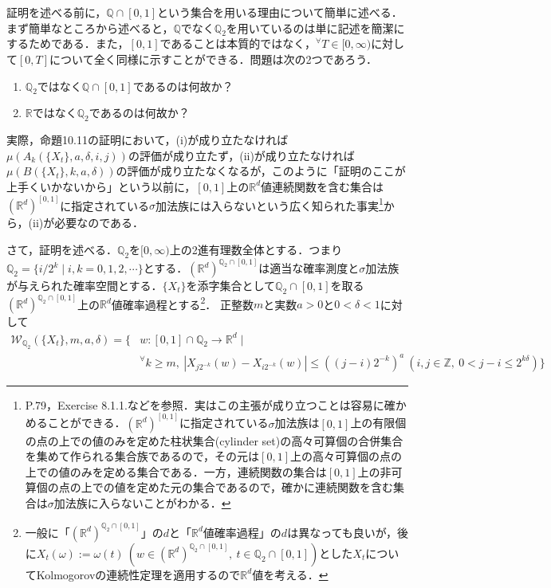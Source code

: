 \documentclass[dvipdfmx]{jsarticle}
\begin{document}
証明を述べる前に，$\mathbb{Q}\cap [0,1]$という集合を用いる理由について簡単に述べる．まず簡単なところから述べると，$\mathbb{Q}$でなく$\mathbb{Q}_2$を用いているのは単に記述を簡潔にするためである．また，$[0,1]$であることは本質的ではなく，$^\forall T\in [0,\infty)$に対して$[0,T]$について全く同様に示すことができる．問題は次の2つであろう．
\begin{enumerate}
\renewcommand{\labelenumi}{(\roman{enumi})}
\item $\mathbb{Q}_2$ではなく$\mathbb{Q}\cap [0,1]$であるのは何故か？
\item $\mathbb{R}$ではなく$\mathbb{Q}_2$であるのは何故か？
\end{enumerate}
実際，\cite{kotani}命題10.11の証明において，(i)が成り立たなければ$\mu(A_k(\{X_t\},a,\delta,i,j))$の評価が成り立たず，(ii)が成り立たなければ$\mu(B(\{X_t\},k,a,\delta))$の評価が成り立たなくなるが，このように「証明のここが上手くいかないから」という以前に，$[0,1]$上の$\mathbb{R}^d$値連続関数を含む集合は$(\mathbb{R}^d)^{[0,1]}$に指定されている$\sigma$加法族には入らないという広く知られた事実\footnote{\cite{kumagai}P.79，\cite{durrett}Exercise 8.1.1.などを参照．実はこの主張が成り立つことは容易に確かめることができる．$(\mathbb{R}^d)^{[0,1]}$に指定されている$\sigma$加法族は$[0,1]$上の有限個の点の上での値のみを定めた柱状集合(cylinder set)の高々可算個の合併集合を集めて作られる集合族であるので，その元は$[0,1]$上の高々可算個の点の上での値のみを定める集合である．一方，連続関数の集合は$[0,1]$上の非可算個の点の上での値を定めた元の集合であるので，確かに連続関数を含む集合は$\sigma$加法族に入らないことがわかる．}から，(ii)が必要なのである．
\par
%
さて，証明を述べる．$\mathbb{Q}_2$を$[0,\infty)$上の2進有理数全体とする．つまり$\mathbb{Q}_2=\{i/2^k\mid i,k=0,1,2,\cdots\}$とする．$(\mathbb{R}^d)^{\mathbb{Q}_2\cap [0,1]}$は適当な確率測度と$\sigma$加法族が与えられた確率空間とする．$\{X_t\}$を添字集合として$\mathbb{Q}_2\cap [0,1]$を取る$(\mathbb{R}^d)^{\mathbb{Q}_2\cap [0,1]}$上の$\mathbb{R}^d$値確率過程とする\footnote{一般に「$(\mathbb{R}^d)^{\mathbb{Q}_2\cap [0,1]}$」の$d$と「$\mathbb{R}^d$値確率過程」の$d$は異なっても良いが，後に$X_t(\omega):=\omega(t){\ }(w\in(\mathbb{R}^d)^{\mathbb{Q}_2\cap [0,1]},{\ }t\in\mathbb{Q}_2\cap [0,1])$とした$X_t$についてKolmogorovの連続性定理を適用するので$\mathbb{R}^d$値を考える．}．
正整数$m$と実数$a>0$と$0<\delta<1$に対して
\begin{align*}
\mathcal{W}_{\mathbb{Q}_2}(\{X_t\},m,a,\delta)=\{&w:[0,1]\cap\mathbb{Q}_2\to\mathbb{R}^d \mid \\
&^\forall k\geq m,{\ }|X_{j2^{-k}}(w)-X_{i2^{-k}}(w)|\leq ((j-i)2^{-k})^a {\ }(i,j\in\mathbb{Z},{\ }0<j-i\leq 2^{k\delta})\}
\end{align*}
\end{document}
